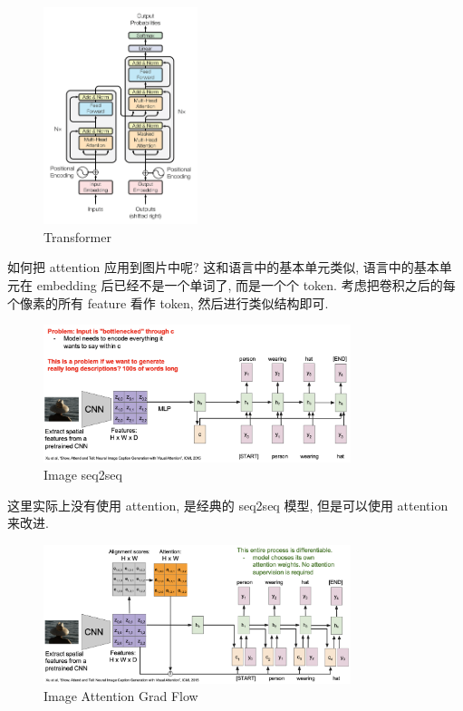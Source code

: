 \begin{figure}[htbp]
    \centering
    \includegraphics[width=0.4\textwidth]{figures/Transformer.png}
    \caption{Transformer}
    \label{fig:Transformer}
\end{figure}

如何把 attention 应用到图片中呢? 这和语言中的基本单元类似, 语言中的基本单元在 embedding 后已经不是一个单词了, 而是一个个 token.
考虑把卷积之后的每个像素的所有 feature 看作 token, 然后进行类似结构即可.

\begin{figure}[htbp]
    \centering
    \includegraphics[width=0.8\textwidth]{figures/image_seq2seq.png}
    \caption{Image seq2seq}
    \label{fig:image_seq2seq}
\end{figure}

这里实际上没有使用 attention, 是经典的 seq2seq 模型, 但是可以使用 attention 来改进.

\begin{figure}[htbp]
    \centering
    \includegraphics[width=0.8\textwidth]{figures/image_attentoin.png}
    \caption{Image Attention Grad Flow}
    \label{fig:image_attentoin}
\end{figure}

